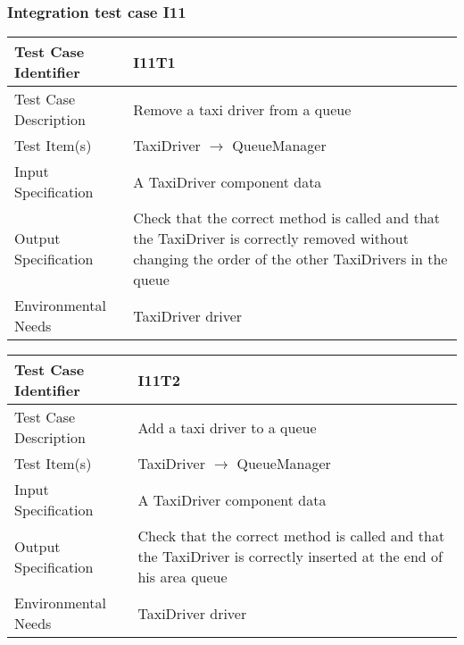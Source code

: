 		\subsubsection{Integration test case I11}
		\begin{center}
			\begin{tabular}{ |l p{10cm}| } \hline
				Test Case Identifier & I11T1 \\ \hline
				Test Case Description & Remove a taxi driver from a queue \\ \hline
				Test Item(s) & TaxiDriver $\rightarrow$ QueueManager \\ \hline
				Input Specification & A TaxiDriver component data \\ \hline
				Output Specification & Check that the correct method is called and that the TaxiDriver is
				correctly removed without changing the order of the other TaxiDrivers in the queue \\ \hline
				Environmental Needs & TaxiDriver driver \\ \hline
			\end{tabular}
			\vspace{1cm}
			\begin{tabular}{ |l p{10cm}| } \hline
				Test Case Identifier & I11T2 \\ \hline
				Test Case Description & Add a taxi driver to a queue \\ \hline
				Test Item(s) & TaxiDriver $\rightarrow$ QueueManager \\ \hline
				Input Specification & A TaxiDriver component data \\ \hline
				Output Specification & Check that the correct method is called and that the TaxiDriver is
				correctly inserted at the end of his area queue \\ \hline
				Environmental Needs & TaxiDriver driver \\ \hline
			\end{tabular}
		\end{center}
